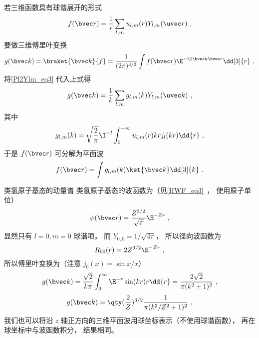 若三维函数具有球谐展开的形式
\begin{equation}
f(\bvec r) = \frac{1}{r}\sum_{l,m} u_{l,m}(r) Y_{l,m}(\uvec r)~,
\end{equation}
要做三维傅里叶变换
\begin{equation}
g(\bvec k) = \braket{\bvec k}{f} =  \frac{1}{(2\pi)^{3/2}} \int f(\bvec r) \E^{-\I \bvec k \bvec r} \dd[3]{r}~.
\end{equation}
将\autoref{Pl2Ylm_eq3} 代入上式得
\begin{equation}
g(\bvec k) = \frac{1}{k} \sum_{l,m} g_{l,m}(k)  Y_{l,m}(\uvec k) ~,
\end{equation}
其中
\begin{equation}
g_{l,m}(k) = \sqrt{\frac{2}{\pi}} \I^{-l} \int_0^{+\infty} u_{l,m}(r) kr j_l(kr) \dd{r}~,
\end{equation}
于是 $f(\bvec r)$ 可分解为平面波
\begin{equation}
f(\bvec r) = \int g_{l,m}(k) \ket{\bvec k} \dd[3]{k}~.
\end{equation}

\begin{example}{类氢原子基态的动量谱}\label{Pl2Ylm_ex1}
类氢原子基态的波函数为（见\autoref{HWF_eq3}~， 使用原子单位）
\begin{equation}
\psi(\bvec r) = \frac{Z^{3/2}}{\sqrt\pi} \E^{-Zr}~,
\end{equation}
显然只有 $l = 0, m = 0$ 球谐项。 而 $Y_{0,0} = 1/\sqrt{4\pi}$， 所以径向波函数为
\begin{equation}
R_{00}(r) = 2 Z^{3/2} \E^{-Zr}~,
\end{equation}
所以傅里叶变换为（注意 $j_0(x) = \sin x/x$）
\begin{equation}
g(\bvec k) = \frac{\sqrt{2}}{k\pi} \int_0^\infty \E^{-r} \sin(kr) r \dd{r} = \frac{2\sqrt{2}}{\pi(k^2+1)^2}~,
\end{equation}
\begin{equation}
g(\bvec k) = \qty(\frac{2}{Z})^{3/2} \frac{1}{\pi(k^2/Z^2 + 1)^2}~.
\end{equation}
我们也可以将沿 $z$ 轴正方向的三维平面波用球坐标表示（不使用球谐函数）， 再在球坐标中与波函数积分， 结果相同。
\end{example}


